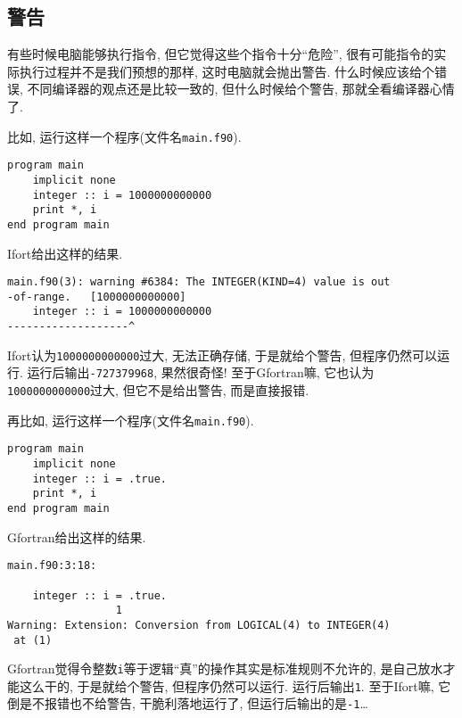 \subsection{警告}\label{fortran_warning}

有些时候电脑能够执行指令, 但它觉得这些个指令十分``危险'', 很有可能指令的实际执行过程并不是我们预想的那样, 这时电脑就会抛出警告. 什么时候应该给个错误, 不同编译器的观点还是比较一致的, 但什么时候给个警告, 那就全看编译器心情了.

比如, 运行这样一个程序(文件名\texttt{main.f90}).
\begin{lstlisting}
program main
    implicit none
    integer :: i = 1000000000000
    print *, i
end program main
\end{lstlisting}

Ifort给出这样的结果.
\begin{lstlisting}
main.f90(3): warning #6384: The INTEGER(KIND=4) value is out
-of-range.   [1000000000000]
    integer :: i = 1000000000000
-------------------^
\end{lstlisting}

Ifort认为\texttt{1000000000000}过大, 无法正确存储, 于是就给个警告, 但程序仍然可以运行. 运行后输出\texttt{-727379968}, 果然很奇怪! 至于Gfortran嘛, 它也认为\texttt{1000000000000}过大, 但它不是给出警告, 而是直接报错.

再比如, 运行这样一个程序(文件名\texttt{main.f90}).
\begin{lstlisting}
program main
    implicit none
    integer :: i = .true.
    print *, i
end program main
\end{lstlisting}

Gfortran给出这样的结果.
\begin{lstlisting}
main.f90:3:18:

    integer :: i = .true.
                 1
Warning: Extension: Conversion from LOGICAL(4) to INTEGER(4)
 at (1)
\end{lstlisting}

Gfortran觉得令整数\texttt{i}等于逻辑``真''的操作其实是标准规则不允许的, 是自己放水才能这么干的, 于是就给个警告, 但程序仍然可以运行. 运行后输出\texttt{1}. 至于Ifort嘛, 它倒是不报错也不给警告, 干脆利落地运行了, 但运行后输出的是\texttt{-1}\dots
